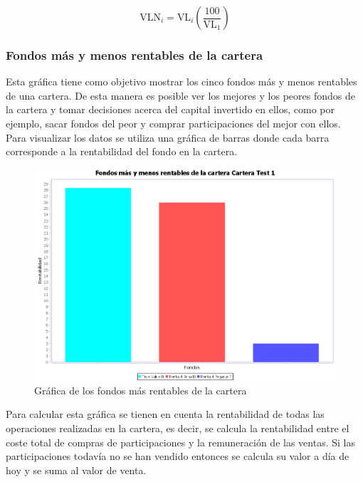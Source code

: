 \documentclass[12pt, a4paper]{book}
\begin{document}
\begin{equation}
\text{VLN}_i=\text{VL}_i\left(\frac{100}{\text{VL}_1}\right)
\end{equation}

	\newpage

\subsubsection{Fondos más y menos rentables de la cartera}

Esta gráfica tiene como objetivo mostrar los cinco fondos más y menos rentables de una cartera. De esta manera es posible ver los mejores y los peores fondos de la cartera y tomar decisiones acerca del capital invertido en ellos, como por ejemplo, sacar fondos del peor y comprar participaciones del mejor con ellos. \\

Para visualizar los datos se utiliza una gráfica de barras donde cada barra corresponde a la rentabilidad del fondo en la cartera.\\


	\begin{figure}[htbp]
	\centering
	\includegraphics[width=\textwidth]{figuras/masrentables.PNG}
	\caption{Gráfica de los fondos más rentables de la cartera}
	\label{fig:masrentables}
	\end {figure}
	
Para calcular esta gráfica se tienen en cuenta la rentabilidad de todas las operaciones realizadas en la cartera, es decir, se calcula la rentabilidad entre el coste total de compras de participaciones y la remuneración de las ventas. Si las participaciones todavía no se han vendido entonces se calcula su valor a día de hoy y se suma al valor de venta.\\
\end{document}

